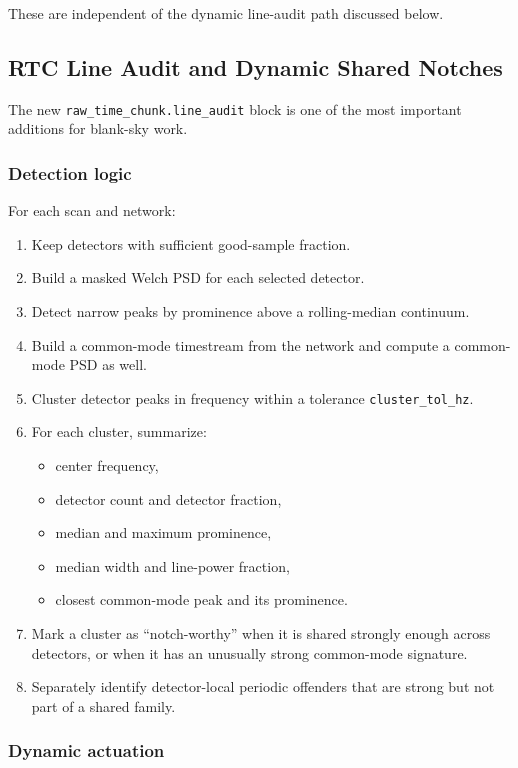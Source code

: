 \documentclass[11pt]{article}
\begin{document}
These are independent of the dynamic line-audit path discussed below.

\subsection{RTC Line Audit and Dynamic Shared Notches}

The new \texttt{raw\_time\_chunk.line\_audit} block is one of the most
important additions for blank-sky work.

\subsubsection{Detection logic}

For each scan and network:

\begin{enumerate}[leftmargin=1.5em]
\item Keep detectors with sufficient good-sample fraction.
\item Build a masked Welch PSD for each selected detector.
\item Detect narrow peaks by prominence above a rolling-median continuum.
\item Build a common-mode timestream from the network and compute a common-mode
PSD as well.
\item Cluster detector peaks in frequency within a tolerance
\texttt{cluster\_tol\_hz}.
\item For each cluster, summarize:
\begin{itemize}[leftmargin=1.5em]
\item center frequency,
\item detector count and detector fraction,
\item median and maximum prominence,
\item median width and line-power fraction,
\item closest common-mode peak and its prominence.
\end{itemize}
\item Mark a cluster as ``notch-worthy'' when it is shared strongly enough
across detectors, or when it has an unusually strong common-mode signature.
\item Separately identify detector-local periodic offenders that are strong but
not part of a shared family.
\end{enumerate}

\subsubsection{Dynamic actuation}
\end{document}
